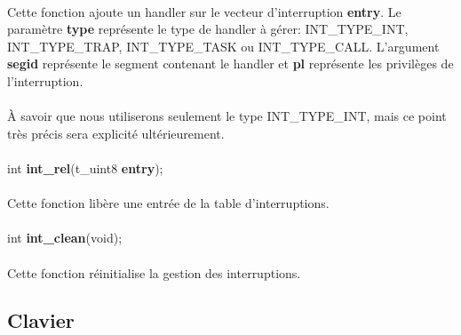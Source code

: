 \documentclass[10pt,a4wide]{article}
\begin{document}
\paragraph{}

Cette fonction ajoute un handler sur le vecteur d'interruption \textbf{entry}.
Le param\`etre \textbf{type} repr\'esente le type de handler \`a g\'erer:
INT\_TYPE\_INT, INT\_TYPE\_TRAP, INT\_TYPE\_TASK ou INT\_TYPE\_CALL. L'argument
\textbf{segid} repr\'esente le segment contenant le handler et \textbf{pl}
repr\'esente les privil\`eges de l'interruption.

\paragraph{}

\`A savoir que nous utiliserons seulement le type INT\_TYPE\_INT, mais
ce point tr\`es pr\'ecis sera explicit\'e ult\'erieurement.

\paragraph{}

\hspace{1.5cm}int \textbf{int\_rel}(t\_uint8 \textbf{entry});

\paragraph{}

Cette fonction lib\`ere une entr\'ee de la table d'interruptions.

\paragraph{}

\hspace{1.5cm}int \textbf{int\_clean}(void);

\paragraph{}

Cette fonction r\'einitialise la gestion des interruptions.

\subsection{Clavier}

\paragraph{}
\end{document}
